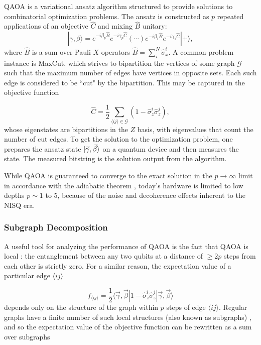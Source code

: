 \documentclass[prb,reprint,nofootinbib,longbibliography,superscriptaddress]{revtex4-1}
\begin{document}
 QAOA is a variational ansatz algorithm structured to provide solutions to combinatorial optimization problems. The ansatz is constructed as $p$ repeated applications of an objective $\hat C$ and mixing $\hat B$ unitary:
\begin{equation}\label{eq:QAOA_ansatz}
|\gamma,\beta\rangle = e^{-i\beta_p \hat B}e^{-i\gamma_p \hat C}(\cdots)e^{-i\beta_1 \hat B}e^{-i\gamma_1 \hat C}|+\rangle ,
\end{equation}
where $\hat B$ is a sum over Pauli $X$ operators $\hat B = \sum_i^N\hat \sigma_x^i$. A common problem instance is MaxCut, which strives to bipartition the vertices of some graph $\mathcal G$ such that the maximum number of edges have vertices in opposite sets. Each such edge is considered to be ``cut" by the bipartition. This may be captured in the objective function

\begin{equation}
\hat C = \frac{1}{2}\sum_{\langle ij\rangle \in \mathcal G}(1 - {\hat \sigma}_z^i {\hat \sigma}_z^j),
\label{eq:maxcut_cost}
\end{equation}
\newcommand{\gb}{{\vec{\gamma}, \vec{\beta}}}
\newcommand{\Z}{{\hat\sigma_z}}
whose eigenstates are bipartitions in the $Z$ basis, with eigenvalues that count the number of cut edges.
To get the solution to the optimization problem, one prepares the ansatz state $\ket \gb$ on a quantum device and then measures the state. The measured bitstring is the solution output from the algorithm.

While  QAOA is guaranteed to converge to the exact solution in the $p\to\infty$ limit in accordance with the adiabatic theorem \cite{farhi2014quantum,wurtz2021counterdiabaticity}, today's hardware is limited to low depths $p\sim 1$ to $5$, because of the noise and decoherence effects inherent to the NISQ era. 


\subsubsection{Subgraph Decomposition}


A useful tool for analyzing the performance of QAOA is  the fact that QAOA is local \cite{farhi2014quantum,farhi2020quantum}: the entanglement between any two qubits at a distance of $\geq2p$ steps from each other is strictly zero. For a similar reason, the expectation value of a particular edge $\langle ij\rangle$

\begin{equation}\label{eq:edge_expectation}
    f_{\langle ij\rangle} = \frac{1}{2}\langle \gb|1 - \hat \sigma_z^i\hat\sigma_z^j|\gb \rangle
\end{equation}
depends only on the structure of the graph within $p$ steps of edge $\langle ij\rangle$. Regular graphs have a finite number of such local structures (also known as subgraphs) \cite{Wurtz_guarantee}, and so the expectation value of the objective function can be rewritten as a sum over subgraphs
\end{document}
